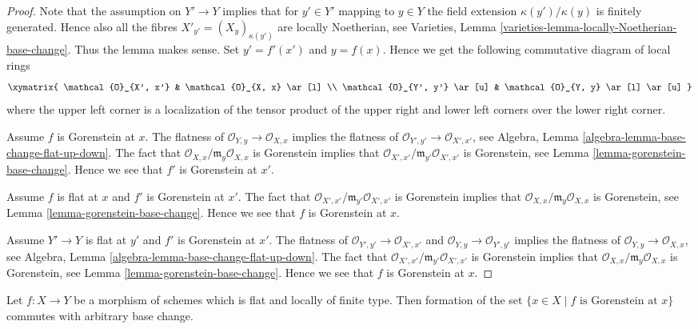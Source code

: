 \begin{proof}
Note that the assumption on $Y' \to Y$ implies that for $y' \in Y'$
mapping to $y \in Y$ the field extension $\kappa(y')/\kappa(y)$
is finitely generated. Hence also all the fibres
$X'_{y'} = (X_y)_{\kappa(y')}$ are locally Noetherian, see
Varieties, Lemma \ref{varieties-lemma-locally-Noetherian-base-change}.
Thus the lemma makes sense. Set $y' = f'(x')$ and $y = f(x)$.
Hence we get the following commutative diagram of local rings
$$
\xymatrix{
\mathcal{O}_{X', x'} & \mathcal{O}_{X, x} \ar[l] \\
\mathcal{O}_{Y', y'} \ar[u] & \mathcal{O}_{Y, y} \ar[l] \ar[u]
}
$$
where the upper left corner is a localization of the tensor product
of the upper right and lower left corners over the lower right corner.

\medskip\noindent
Assume $f$ is Gorenstein at $x$.
The flatness of $\mathcal{O}_{Y, y} \to \mathcal{O}_{X, x}$
implies the flatness of $\mathcal{O}_{Y', y'} \to \mathcal{O}_{X', x'}$, see
Algebra, Lemma \ref{algebra-lemma-base-change-flat-up-down}.
The fact that $\mathcal{O}_{X, x}/\mathfrak m_y\mathcal{O}_{X, x}$
is Gorenstein implies that
$\mathcal{O}_{X', x'}/\mathfrak m_{y'}\mathcal{O}_{X', x'}$
is Gorenstein, see
Lemma \ref{lemma-gorenstein-base-change}. Hence we see that $f'$
is Gorenstein at $x'$.

\medskip\noindent
Assume $f$ is flat at $x$ and $f'$ is Gorenstein at $x'$.
The fact that $\mathcal{O}_{X', x'}/\mathfrak m_{y'}\mathcal{O}_{X', x'}$
is Gorenstein implies that
$\mathcal{O}_{X, x}/\mathfrak m_y\mathcal{O}_{X, x}$
is Gorenstein, see
Lemma \ref{lemma-gorenstein-base-change}. Hence we see that $f$
is Gorenstein at $x$.

\medskip\noindent
Assume $Y' \to Y$ is flat at $y'$ and $f'$ is Gorenstein at
$x'$. The flatness of $\mathcal{O}_{Y', y'} \to \mathcal{O}_{X', x'}$
and $\mathcal{O}_{Y, y} \to \mathcal{O}_{Y', y'}$ implies the flatness
of $\mathcal{O}_{Y, y} \to \mathcal{O}_{X, x}$, see
Algebra, Lemma \ref{algebra-lemma-base-change-flat-up-down}.
The fact that $\mathcal{O}_{X', x'}/\mathfrak m_{y'}\mathcal{O}_{X', x'}$
is Gorenstein implies that
$\mathcal{O}_{X, x}/\mathfrak m_y\mathcal{O}_{X, x}$
is Gorenstein, see
Lemma \ref{lemma-gorenstein-base-change}. Hence we see that $f$
is Gorenstein at $x$.
\end{proof}

\begin{lemma}
\label{lemma-flat-lft-base-change-gorenstein}
Let $f : X \to Y$ be a morphism of schemes which is flat and
locally of finite type. Then formation of the set
$\{x \in X \mid f\text{ is Gorenstein at }x\}$
commutes with arbitrary base change.
\end{lemma}

